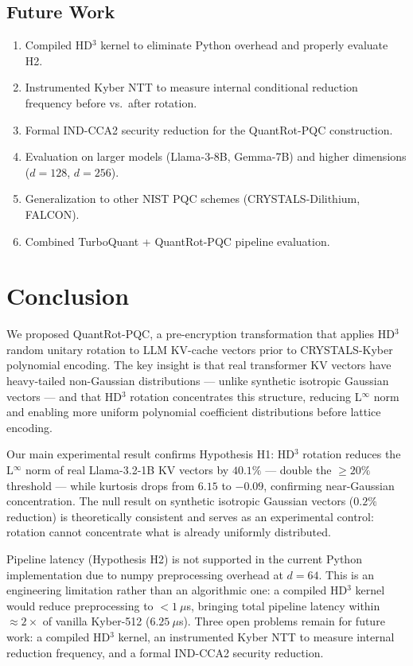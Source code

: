 \documentclass[preprint,a4paper]{article}
\begin{document}
\subsection{Future Work}
\label{sec:future}

\begin{enumerate}
    \item Compiled HD$^3$ kernel to eliminate
    Python overhead and properly evaluate H2.
    \item Instrumented Kyber NTT to measure
    internal conditional reduction frequency
    before vs.\ after rotation.
    \item Formal IND-CCA2 security reduction
    for the QuantRot-PQC construction.
    \item Evaluation on larger models
    (Llama-3-8B, Gemma-7B) and higher
    dimensions ($d = 128$, $d = 256$).
    \item Generalization to other NIST PQC
    schemes (CRYSTALS-Dilithium, FALCON).
    \item Combined TurboQuant + QuantRot-PQC
    pipeline evaluation.
\end{enumerate}

\section{Conclusion}
\label{sec:conclusion}
We proposed QuantRot-PQC, a pre-encryption transformation
that applies HD$^3$ random unitary rotation to LLM
KV-cache vectors prior to CRYSTALS-Kyber polynomial
encoding. The key insight is that real transformer KV
vectors have heavy-tailed non-Gaussian distributions
--- unlike synthetic isotropic Gaussian vectors ---
and that HD$^3$ rotation concentrates this structure,
reducing L$^\infty$ norm and enabling more uniform
polynomial coefficient distributions before lattice
encoding.

Our main experimental result confirms Hypothesis H1:
HD$^3$ rotation reduces the L$^\infty$ norm of real
Llama-3.2-1B KV vectors by $40.1\%$ --- double the
$\geq 20\%$ threshold --- while kurtosis drops from
$6.15$ to $-0.09$, confirming near-Gaussian
concentration. The null result on synthetic isotropic
Gaussian vectors ($0.2\%$ reduction) is theoretically
consistent and serves as an experimental control:
rotation cannot concentrate what is already uniformly
distributed.

Pipeline latency (Hypothesis H2) is not supported
in the current Python implementation due to numpy
preprocessing overhead at $d = 64$. This is an
engineering limitation rather than an algorithmic
one: a compiled HD$^3$ kernel would reduce
preprocessing to $< 1~\mu$s, bringing total pipeline
latency within $\approx 2\times$ of vanilla
Kyber-512 ($6.25~\mu$s). Three open problems remain
for future work: a compiled HD$^3$ kernel, an
instrumented Kyber NTT to measure internal reduction
frequency, and a formal IND-CCA2 security reduction.
\end{document}
